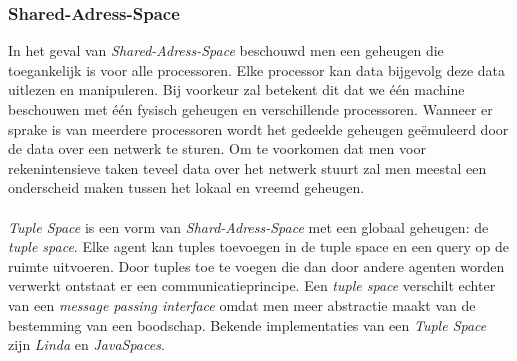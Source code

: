 \subsubsection{Shared-Adress-Space}

In het geval van \emph{Shared-Adress-Space} beschouwd men een geheugen die toegankelijk is voor alle processoren. Elke processor kan data bijgevolg deze data uitlezen en manipuleren. Bij voorkeur zal betekent dit dat we \'e\'en machine beschouwen met \'e\'en fysisch geheugen en verschillende processoren. Wanneer er sprake is van meerdere processoren wordt het gedeelde geheugen ge\"emuleerd door de data over een netwerk te sturen. Om te voorkomen dat men voor rekenintensieve taken teveel data over het netwerk stuurt zal men meestal een onderscheid maken tussen het lokaal en vreemd geheugen.\cite{books/bc/KumarGGK94}

\paragraph{}
\emph{Tuple Space} is een vorm van \emph{Shard-Adress-Space} met een globaal geheugen: de \emph{tuple space}. Elke agent kan tuples toevoegen in de tuple space en een query op de ruimte uitvoeren. Door tuples toe te voegen die dan door andere agenten worden verwerkt ontstaat er een communicatieprincipe. Een \emph{tuple space} verschilt echter van een \emph{message passing interface} omdat men meer abstractie maakt van de bestemming van een boodschap. Bekende implementaties van een \emph{Tuple Space} zijn \emph{Linda} en \emph{JavaSpaces}\cite{books/bc/KumarGGK94,books/daglib/0066939,books/daglib/0015079,Gelernter85,javaspaces}.

